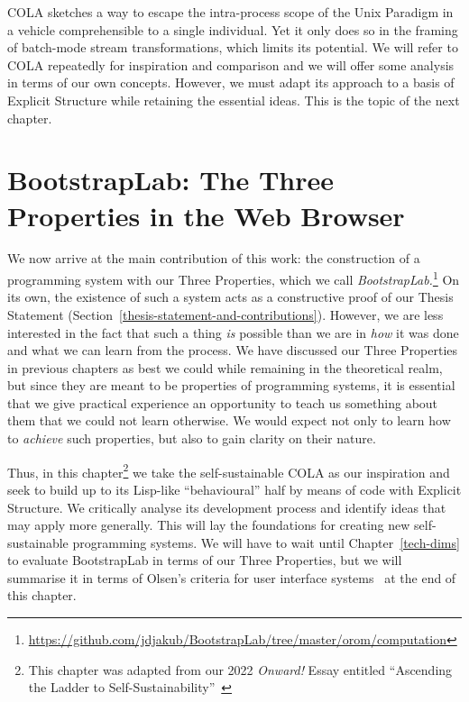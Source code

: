 \documentclass[ twoside,openright,titlepage,numbers=noenddot,headinclude,footinclude,cleardoublepage=empty,abstract=on,
                BCOR=5mm,paper=a4,fontsize=11pt
                ]{scrreprt}
\newcommand{\joel}[1]{}
\newcommand{\OROM}{Id}
\theoremstyle{definition}
\begin{document}
\ac{COLA} sketches a way to escape the intra-process scope of the Unix
Paradigm in a vehicle comprehensible to a single individual. Yet it only
does so in the framing of batch-mode stream transformations, which
limits its potential. We will refer to \ac{COLA} repeatedly for
inspiration and comparison and we will offer some analysis in terms of
our own concepts. However, we must adapt its approach to a basis of
Explicit Structure while retaining the essential ideas. This is the
topic of the next chapter.
\clearpage{}
\cleardoublepage
\clearpage{}\hypertarget{bl}{\chapter{BootstrapLab: The Three Properties in the Web Browser}\label{bl}}

\newtheorem{force}{Force}
\newtheorem{requirement}{Requirement}

\joel{
Having tried the "notation-first" approach with diminishing returns in Chapter\ \ref{year1}, we now turn our efforts towards prioritising self-sustainability. Recall that we took the "\OROM{}" half of the COLA design as our starting point and made things happen with plain JavaScript. This left us at the mercy of text strings as a starting point for building the "code" half.}

We now arrive at the main contribution of this work: the construction of
a programming system with our Three Properties, which we call
\emph{BootstrapLab.}\footnote{\url{https://github.com/jdjakub/BootstrapLab/tree/master/orom/computation}}
On its own, the existence of such a system acts as a constructive proof
of our Thesis Statement
(Section~\ref{thesis-statement-and-contributions}). However, we are less
interested in the fact that such a thing \emph{is} possible than we are
in \emph{how} it was done and what we can learn from the process. We
have discussed our Three Properties in previous chapters as best we
could while remaining in the theoretical realm, but since they are meant
to be properties of programming systems, it is essential that we give
practical experience an opportunity to teach us something about them
that we could not learn otherwise. We would expect not only to learn how
to \emph{achieve} such properties, but also to gain clarity on their
nature.

Thus, in this chapter\footnote{This chapter was adapted from our 2022
  \emph{Onward!} Essay entitled ``Ascending the Ladder to
  Self-Sustainability''~\parencite{Onward22}} we take the
self-sustainable \ac{COLA} as our inspiration and seek to build up to
its Lisp-like ``behavioural'' half by means of code with Explicit
Structure. We critically analyse its development process and identify
ideas that may apply more generally. This will lay the foundations for
creating new self-sustainable programming systems. We will have to wait
until Chapter~\ref{tech-dims} to evaluate BootstrapLab in terms of our
Three Properties, but we will summarise it in terms of Olsen's criteria
for user interface systems~\parencite{EvUISR} at the end of this
chapter.
\end{document}
